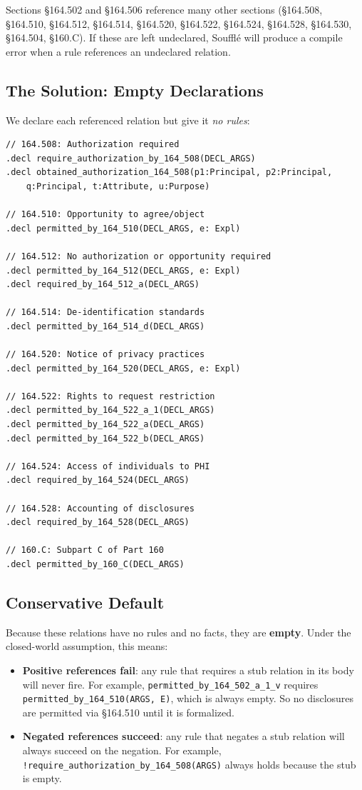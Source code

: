 \documentclass[11pt,letterpaper]{article}
\begin{document}
Sections \S 164.502 and \S 164.506 reference many other sections (\S 164.508, \S 164.510, \S 164.512, \S 164.514, \S 164.520, \S 164.522, \S 164.524, \S 164.528, \S 164.530, \S 164.504, \S 160.C). If these are left undeclared, Souffl\'{e} will produce a compile error when a rule references an undeclared relation.

\subsection{The Solution: Empty Declarations}

We declare each referenced relation but give it \emph{no rules}:

\begin{lstlisting}[style=soufflestyle,caption={Examples from hipaa\_stubs.dl}]
// 164.508: Authorization required
.decl require_authorization_by_164_508(DECL_ARGS)
.decl obtained_authorization_164_508(p1:Principal, p2:Principal,
    q:Principal, t:Attribute, u:Purpose)

// 164.510: Opportunity to agree/object
.decl permitted_by_164_510(DECL_ARGS, e: Expl)

// 164.512: No authorization or opportunity required
.decl permitted_by_164_512(DECL_ARGS, e: Expl)
.decl required_by_164_512_a(DECL_ARGS)

// 164.514: De-identification standards
.decl permitted_by_164_514_d(DECL_ARGS)

// 164.520: Notice of privacy practices
.decl permitted_by_164_520(DECL_ARGS, e: Expl)

// 164.522: Rights to request restriction
.decl permitted_by_164_522_a_1(DECL_ARGS)
.decl permitted_by_164_522_a(DECL_ARGS)
.decl permitted_by_164_522_b(DECL_ARGS)

// 164.524: Access of individuals to PHI
.decl required_by_164_524(DECL_ARGS)

// 164.528: Accounting of disclosures
.decl required_by_164_528(DECL_ARGS)

// 160.C: Subpart C of Part 160
.decl permitted_by_160_C(DECL_ARGS)
\end{lstlisting}

\subsection{Conservative Default}

Because these relations have no rules and no facts, they are \textbf{empty}. Under the closed-world assumption, this means:
\begin{itemize}
  \item \textbf{Positive references fail}: any rule that requires a stub relation in its body will never fire. For example, \texttt{permitted\_by\_164\_502\_a\_1\_v} requires \texttt{permitted\_by\_164\_510(ARGS, E)}, which is always empty. So no disclosures are permitted via \S 164.510 until it is formalized.
  \item \textbf{Negated references succeed}: any rule that negates a stub relation will always succeed on the negation. For example, \texttt{!require\_authorization\_by\_164\_508(ARGS)} always holds because the stub is empty.
\end{itemize}
\end{document}
